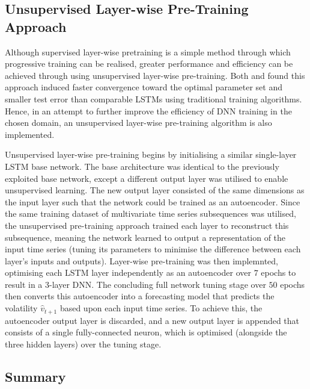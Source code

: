 \documentclass[a4paper, 11pt]{report}
\begin{document}
    \subsection{Unsupervised Layer-wise Pre-Training Approach}

    Although supervised layer-wise pretraining is a simple method through which progressive training can be realised, greater performance and efficiency can be achieved through using unsupervised layer-wise pre-training. Both \citet{xu-2018} and \citet{sagheer-2019} found this approach induced faster convergence toward the optimal parameter set and smaller test error than comparable LSTMs using traditional training algorithms. Hence, in an attempt to further improve the efficiency of DNN training in the chosen domain, an unsupervised layer-wise pre-training algorithm is also implemented.

    Unsupervised layer-wise pre-training begins by initialising a similar single-layer LSTM base network. The base architecture was identical to the previously exploited base network, except a different output layer was utilised to enable unsupervised learning. The new output layer consisted of the same dimensions as the input layer such that the network could be trained as an autoencoder. Since the same training dataset of multivariate time series subsequences was utilised, the unsupervised pre-training approach trained each layer to reconstruct this subsequence, meaning the network learned to output a representation of the input time series (tuning its parameters to minimise the difference between each layer's inputs and outputs). Layer-wise pre-training was then implemnted, optimising each LSTM layer independently as an autoencoder over $7$ epochs to result in a 3-layer DNN. The concluding full network tuning stage over $50$ epochs then converts this autoencoder into a forecasting model that predicts the volatility $\hat{v}_{t+1}$ based upon each input time series. To achieve this, the autoencoder output layer is discarded, and a new output layer is appended that consists of a single fully-connected neuron, which is optimised (alongside the three hidden layers) over the tuning stage.


    \subsection{Summary}
\end{document}
